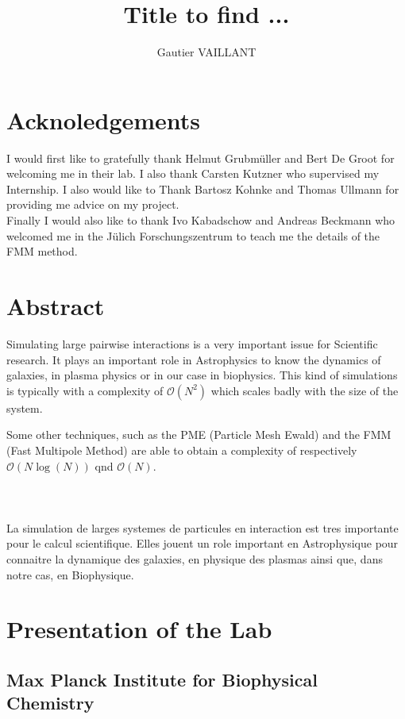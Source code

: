 \documentclass[12pt,twoside,a4paper]{report}
\title{Title to find ...}
\author{Gautier VAILLANT}
\begin{document}
\maketitle

\chapter*{Acknoledgements}

I would first like to gratefully thank Helmut Grubmüller and Bert De Groot for welcoming me in their lab. I also thank Carsten Kutzner who supervised my Internship. I also would like to Thank Bartosz Kohnke and Thomas Ullmann for providing me advice on my project.\\ 

Finally I would also like to thank Ivo Kabadschow and Andreas Beckmann who welcomed me in the Jülich Forschungszentrum to teach me the details of the FMM method. 


\chapter*{Abstract}

Simulating large pairwise interactions is a very important issue for Scientific research. It plays an important role in Astrophysics to know the dynamics of galaxies, in plasma physics or in our case in biophysics. This kind of simulations is typically with a complexity of $\mathcal{O}(N^2)$ which scales badly with the size of the system.

Some other techniques, such as the PME (Particle Mesh Ewald) and the FMM (Fast Multipole Method) are able to obtain a complexity of respectively $\mathcal{O}(N\log(N))$ qnd $\mathcal{O}(N)$.
\\
\\
\\
\\

La simulation de larges systemes de particules en interaction est tres importante pour le calcul scientifique. Elles jouent un role important en Astrophysique pour connaitre la dynamique des galaxies, en physique des plasmas ainsi que, dans notre cas, en Biophysique.


\tableofcontents

\chapter*{Presentation of the Lab}
\section*{Max Planck Institute for Biophysical Chemistry}
\end{document}
